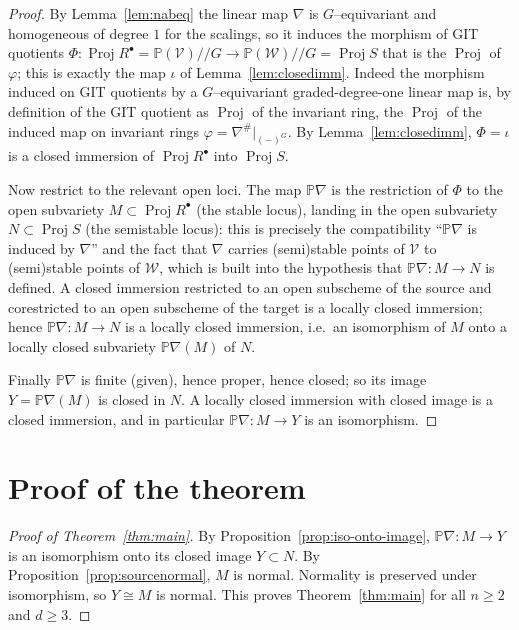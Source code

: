 \documentclass{amsart}
\theoremstyle{definition}
\DeclareMathOperator{\Proj}{Proj}
\newcommand{\PP}{\mathbb{P}}
\newcommand{\nab}{\nabla}
\begin{document}
\begin{proof}
By Lemma~\ref{lem:nabeq} the linear map $\nab$ is $G$--equivariant and homogeneous of degree
$1$ for the scalings, so it induces the morphism of GIT quotients
$\Phi\colon \Proj R^{\bullet}=\PP(\mathcal V)/\!/G\to \PP(\mathcal W)/\!/G=\Proj S$ that is the
$\Proj$ of $\varphi$; this is exactly the map $\iota$ of Lemma~\ref{lem:closedimm}. Indeed
the morphism induced on GIT quotients by a $G$--equivariant graded-degree-one linear map is,
by definition of the GIT quotient as $\Proj$ of the invariant ring, the $\Proj$ of the
induced map on invariant rings $\varphi=\nab^{\#}|_{(-)^G}$. By Lemma~\ref{lem:closedimm},
$\Phi=\iota$ is a closed immersion of $\Proj R^{\bullet}$ into $\Proj S$.

Now restrict to the relevant open loci. The map $\PP\nab$ is the restriction of $\Phi$ to the
open subvariety $M\subset \Proj R^{\bullet}$ (the stable locus), landing in the open
subvariety $N\subset\Proj S$ (the semistable locus): this is precisely the compatibility
``$\PP\nab$ is induced by $\nab$'' and the fact that $\nab$ carries (semi)stable points of
$\mathcal V$ to (semi)stable points of $\mathcal W$, which is built into the hypothesis that
$\PP\nab\colon M\to N$ is defined. A closed immersion restricted to an open subscheme of the
source and corestricted to an open subscheme of the target is a locally closed immersion;
hence $\PP\nab\colon M\to N$ is a locally closed immersion, i.e.\ an isomorphism of $M$ onto a
locally closed subvariety $\PP\nab(M)$ of $N$.

Finally $\PP\nab$ is finite (given), hence proper, hence closed; so its image $Y=\PP\nab(M)$
is closed in $N$. A locally closed immersion with closed image is a closed immersion, and in
particular $\PP\nab\colon M\to Y$ is an isomorphism.
\end{proof}

\section{Proof of the theorem}\label{sec:conclude}

\begin{proof}[Proof of Theorem~\ref{thm:main}]
By Proposition~\ref{prop:iso-onto-image}, $\PP\nab\colon M\to Y$ is an isomorphism onto its
closed image $Y\subset N$. By Proposition~\ref{prop:sourcenormal}, $M$ is normal. Normality
is preserved under isomorphism, so $Y\cong M$ is normal. This proves Theorem~\ref{thm:main}
for all $n\ge 2$ and $d\ge 3$.
\end{proof}
\end{document}
